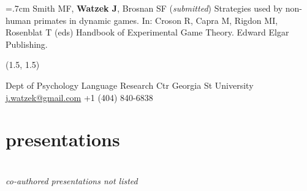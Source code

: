 \documentclass[]{friggeri-cv}
\begin{document}
\hangindent=.7cm Smith MF, \textbf{Watzek J}, Brosnan SF (\emph{submitted}) Strategies used by non-human primates in dynamic games. In: Croson R, Capra M, Rigdon MI, Rosenblat T (eds) Handbook of Experimental Game Theory. Edward Elgar Publishing.


\newpage
\thispagestyle{fancy}

\renewenvironment{aside}{%
  \let\oldsection\section
  \renewcommand{\section}[1]{
    \par\vspace{\baselineskip}{\Large\headingfont\color{headercolor} ##1}
  }
  \begin{textblock}{3.6}(1.5, 1.5)
  \begin{flushright}
  \obeycr
}{%
  \restorecr
  \end{flushright}
  \end{textblock}
  \let\section\oldsection
}


\begin{aside}
  \section{{\normalfont julia}watzek}
    Dept of Psychology
    Language Research Ctr
    Georgia St University
    ~
    \href{mailto:j.watzek@gmail.com}{j.watzek@gmail.com}
    +1 (404) 840-6838
\end{aside}


\section{presentations}
~\\[-.75cm]
\hspace{.35cm} {\small{} \emph{co-authored presentations not listed}}\\[.5cm] %
\end{document}

